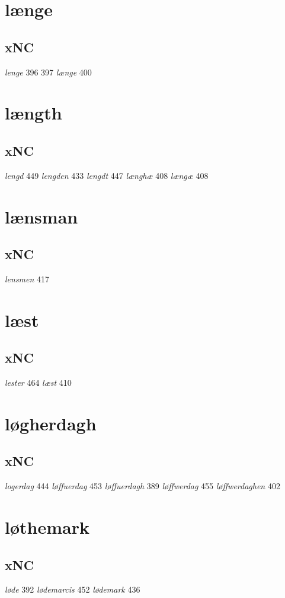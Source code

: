 \documentclass[a4paper,twocolumn]{article}
\begin{document}
\section{længe}
\label{sec:orgc9e2445}
\subsection{xNC}
\label{sec:orgaf9db8a}
\emph{lenge} 396 397 \emph{længe} 400 
\section{længth}
\label{sec:orgf679394}
\subsection{xNC}
\label{sec:org5d15b8e}
\emph{lengd} 449 \emph{lengden} 433 \emph{lengdt} 447 \emph{længhæ} 408 \emph{længæ} 408 
\section{lænsman}
\label{sec:org718ad0b}
\subsection{xNC}
\label{sec:orgc6e061f}
\emph{lensmen} 417 
\section{læst}
\label{sec:org94e4885}
\subsection{xNC}
\label{sec:orgfa5147a}
\emph{lester} 464 \emph{læst} 410 
\section{løgherdagh}
\label{sec:orge4633ef}
\subsection{xNC}
\label{sec:org2612ac7}
\emph{logerdag} 444 \emph{løffuerdag} 453 \emph{løffuerdagh} 389 \emph{løffwerdag} 455 \emph{løffwerdaghen} 402 
\section{løthemark}
\label{sec:orge1f5647}
\subsection{xNC}
\label{sec:org1bfb43b}
\emph{løde} 392 \emph{lødemarcis} 452 \emph{lødemark} 436 
\end{document}
